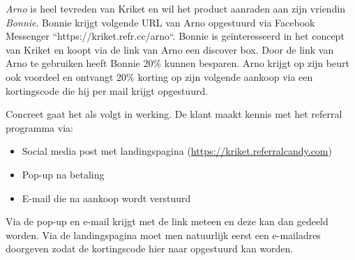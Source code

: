 \emph{Arno} is heel tevreden van Kriket en wil het product aanraden aan zijn vriendin \emph{Bonnie}. Bonnie krijgt volgende URL van Arno opgestuurd via Facebook Messenger ``https://kriket.refr.cc/arno``. Bonnie is geïnteresseerd in het concept van Kriket en koopt via de link van Arno een discover box. Door de link van Arno te gebruiken heeft Bonnie 20\% kunnen besparen. Arno krijgt op zijn beurt ook voordeel en ontvangt 20\% korting op zijn volgende aankoop via een kortingscode die hij per mail krijgt opgestuurd.

Concreet gaat het als volgt in werking. De klant maakt kennis met het referral programma via:
\begin{itemize}
	\item Social media post met landingspagina (\href{https://kriket.referralcandy.com}{https://kriket.referralcandy.com})
	\item Pop-up na betaling
	\item E-mail die na aankoop wordt verstuurd
\end{itemize}

Via de pop-up en e-mail krijgt met de link meteen en deze kan dan gedeeld worden. Via de landingspagina moet men natuurlijk eerst een e-mailadres doorgeven zodat de kortingscode hier naar opgestuurd kan worden. 

